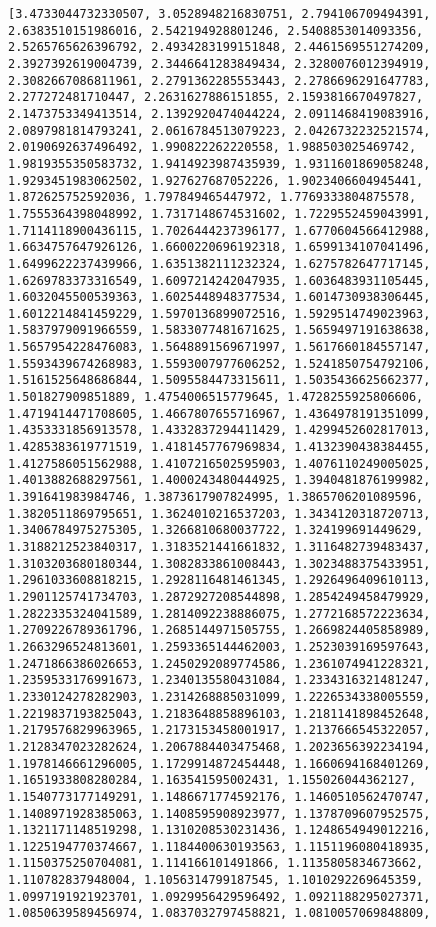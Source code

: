 \documentclass[11pt]{article}
\begin{document}
\begin{Verbatim}[commandchars=\\\{\}]
[3.4733044732330507, 3.0528948216830751, 2.794106709494391, 2.6383510151986016, 2.542194928801246, 2.5408853014093356, 2.5265765626396792, 2.4934283199151848, 2.4461569551274209, 2.3927392619004739, 2.3446641283849434, 2.3280076012394919, 2.3082667086811961, 2.2791362285553443, 2.2786696291647783, 2.277272481710447, 2.2631627886151855, 2.1593816670497827, 2.1473753349413514, 2.1392920474044224, 2.0911468419083916, 2.0897981814793241, 2.0616784513079223, 2.0426732232521574, 2.0190692637496492, 1.990822262220558, 1.988503025469742, 1.9819355350583732, 1.9414923987435939, 1.9311601869058248, 1.9293451983062502, 1.927627687052226, 1.9023406604945441, 1.872625752592036, 1.797849465447972, 1.7769333804875578, 1.7555364398048992, 1.7317148674531602, 1.7229552459043991, 1.7114118900436115, 1.7026444237396177, 1.6770604566412988, 1.6634757647926126, 1.6600220696192318, 1.6599134107041496, 1.6499622237439966, 1.6351382111232324, 1.6275782647717145, 1.6269783373316549, 1.6097214242047935, 1.6036483931105445, 1.6032045500539363, 1.6025448948377534, 1.6014730938306445, 1.6012214841459229, 1.5970136899072516, 1.5929514749023963, 1.5837979091966559, 1.5833077481671625, 1.5659497191638638, 1.5657954228476083, 1.5648891569671997, 1.5617660184557147, 1.5593439674268983, 1.5593007977606252, 1.5241850754792106, 1.5161525648686844, 1.5095584473315611, 1.5035436625662377, 1.501827909851889, 1.4754006515779645, 1.4728255925806606, 1.4719414471708605, 1.4667807655716967, 1.4364978191351099, 1.4353331856913578, 1.4332837294411429, 1.4299452602817013, 1.4285383619771519, 1.4181457767969834, 1.4132390438384455, 1.4127586051562988, 1.4107216502595903, 1.4076110249005025, 1.4013882688297561, 1.4000243480444925, 1.3940481876199982, 1.391641983984746, 1.3873617907824995, 1.3865706201089596, 1.3820511869795651, 1.3624010216537203, 1.3434120318720713, 1.3406784975275305, 1.3266810680037722, 1.324199691449629, 1.3188212523840317, 1.3183521441661832, 1.3116482739483437, 1.3103203680180344, 1.3082833861008443, 1.3023488375433951, 1.2961033608818215, 1.2928116481461345, 1.2926496409610113, 1.2901125741734703, 1.2872927208544898, 1.2854249458479929, 1.2822335324041589, 1.2814092238886075, 1.2772168572223634, 1.2709226789361796, 1.2685144971505755, 1.2669824405858989, 1.2663296524813601, 1.2593365144462003, 1.2523039169597643, 1.2471866386026653, 1.2450292089774586, 1.2361074941228321, 1.2359533176991673, 1.2340135580431084, 1.2334316321481247, 1.2330124278282903, 1.2314268885031099, 1.2226534338005559, 1.2219837193825043, 1.2183648858896103, 1.2181141898452648, 1.2179576829963965, 1.2173153458001917, 1.2137666545322057, 1.2128347023282624, 1.2067884403475468, 1.2023656392234194, 1.1978146661296005, 1.1729914872454448, 1.1660694168401269, 1.1651933808280284, 1.163541595002431, 1.155026044362127, 1.1540773177149291, 1.1486671774592176, 1.1460510562470747, 1.1408971928385063, 1.1408595908923977, 1.1378709607952575, 1.1321171148519298, 1.1310208530231436, 1.1248654949012216, 1.1225194770374667, 1.1184400630193563, 1.1151196080418935, 1.1150375250704081, 1.114166101491866, 1.1135805834673662, 1.110782837948004, 1.1056314799187545, 1.1010292269645359, 1.0997191921923701, 1.0929956429596492, 1.0921188295027371, 1.0850639589456974, 1.0837032797458821, 1.0810057069848809, 
\end{Verbatim}
\end{document}
